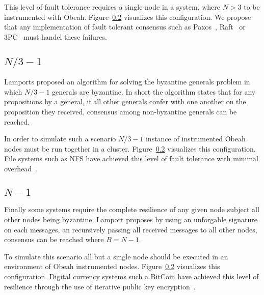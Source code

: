 This level of fault tolerance requires a single node in a system, where $N > 3$
to be instrumented with Obeah. Figure~\ref{} visualizes this configuration. We
propose that any implementation of fault tolerant consensus such as
Paxos~\cite{Lamport2001Paxos}, Raft~\cite{184040} or 3PC~\cite{1703048} must handel these failures.

\subsection{$N/3 -1$}

Lamports proposed an algorithm for solving the byzantine generals problem in
which $N/3-1$ generals are byzantine. In short the algorithm states that for
any propositions by a general, if all other generals confer with one another on
the proposition they received, consensus among non-byzantine generals can be
reached.

In order to simulate such a scenario $N/3 - 1$ instance of instrumented Obeah
nodes must be run together in a cluster. Figure~\ref{} visualizes this
configuration. File systems such as NFS have achieved this level of fault
tolerance with minimal overhead~\cite{Castro:1999:PBF:296806.296824}.

\subsection{$N-1$}

Finally some systems require the complete resilience of any given node subject all other nodes being byzantine. Lamport proposes by using an unforgable signature on each messages, an recursively passing all received messages to all other nodes, consensus can be reached where $B = N -1$.

To simulate this scenario all but a single node should be executed in an
environment of Obeah instrumented nodes. Figure~\ref{} visualizes this
configuration. Digital currency systems such a BitCoin have achieved this level
of resilience through the use of iterative public key
encryption~\cite{Nakamoto_bitcoin:a}.
